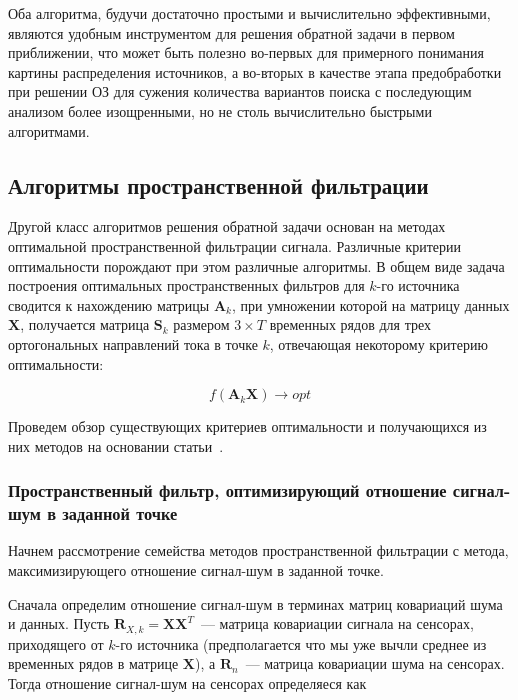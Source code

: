Оба алгоритма, будучи достаточно простыми и вычислительно эффективными,
являются удобным инструментом для решения обратной задачи в первом приближении,
что может быть полезно во-первых для примерного понимания картины распределения
источников, а во-вторых в качестве этапа предобработки при решении ОЗ
для сужения количества вариантов поиска с последующим анализом более
изощренными, но не столь вычислительно быстрыми алгоритмами.

\subsection{Алгоритмы пространственной фильтрации}

Другой класс алгоритмов решения обратной задачи основан на методах оптимальной пространственной
фильтрации сигнала. Различные критерии оптимальности порождают при этом различные алгоритмы.
В общем виде задача построения оптимальных пространственных фильтров для $k$-го источника
сводится к нахождению
матрицы $\mathbf{A}_k$, при умножении которой на матрицу данных $\mathbf{X}$, получается
матрица $\mathbf{S}_k$ размером $3\times T$ временных рядов для трех ортогональных
направлений тока в точке $k$, отвечающая некоторому критерию оптимальности:

\begin{equation}
    f(\mathbf{A}_k \mathbf{X}) \rightarrow opt
\end{equation}

Проведем обзор существующих критериев оптимальности и получающихся из них методов на
основании статьи~\cite{Gross1999}.

\subsubsection{Пространственный фильтр, оптимизирующий отношение сигнал-шум в заданной точке}\label{subsubsec:max_snr_filter}

Начнем рассмотрение семейства методов пространственной фильтрации с метода, максимизирующего
отношение сигнал-шум в заданной точке.

Сначала определим отношение сигнал-шум в терминах матриц ковариаций шума и данных.
Пусть $\mathbf{R}_{X,k} = \mathbf{X}\mathbf{X}^T$~--- матрица ковариации сигнала на сенсорах,
приходящего от $k$-го источника
(предполагается что мы уже вычли среднее из временных рядов в матрице $\mathbf{X}$),
а $\mathbf{R}_n$~--- матрица ковариации шума на сенсорах. Тогда отношение
сигнал-шум на сенсорах определяеся как

